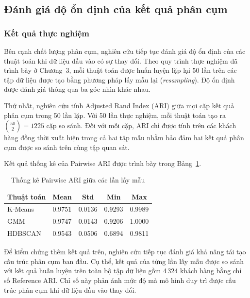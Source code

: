 \documentclass[12pt]{ai_conquer2026}
\begin{document}
\subsection{Đánh giá độ ổn định của kết quả phân cụm}

\subsubsection{Kết quả thực nghiệm}

Bên cạnh chất lượng phân cụm, nghiên cứu tiếp tục đánh giá độ ổn định của các thuật toán khi dữ liệu đầu vào có sự thay đổi. Theo quy trình thực nghiệm đã trình bày ở Chương~3, mỗi thuật toán được huấn luyện lặp lại 50 lần trên các tập dữ liệu được tạo bằng phương pháp lấy mẫu lại (\textit{resampling}). Độ ổn định được đánh giá thông qua ba góc nhìn khác nhau.

Thứ nhất, nghiên cứu tính Adjusted Rand Index (ARI) giữa mọi cặp kết quả phân cụm trong 50 lần lặp. Với 50 lần thực nghiệm, mỗi thuật toán tạo ra $\binom{50}{2}=1225$ cặp so sánh. Đối với mỗi cặp, ARI chỉ được tính trên các khách hàng đồng thời xuất hiện trong cả hai tập mẫu nhằm bảo đảm hai kết quả phân cụm được so sánh trên cùng tập quan sát.

Kết quả thống kê của Pairwise ARI được trình bày trong Bảng~\ref{tab:pairwise_ari}.

\begin{table}[H]
\centering
\caption{Thống kê Pairwise ARI giữa các lần lấy mẫu}
\label{tab:pairwise_ari}
\renewcommand{\arraystretch}{1.2}
\begin{tabular}{lcccc}
\toprule
\textbf{Thuật toán} &
\textbf{Mean} &
\textbf{Std} &
\textbf{Min} &
\textbf{Max} \\
\midrule
K-Means & 0.9751 & 0.0136 & 0.9293 & 0.9989\\
GMM & 0.9747 & 0.0143 & 0.9206 & 1.0000\\
HDBSCAN & 0.9543 & 0.0506 & 0.6894 & 0.9811\\
\bottomrule
\end{tabular}
\end{table}

Để kiểm chứng thêm kết quả trên, nghiên cứu tiếp tục đánh giá khả năng tái tạo cấu trúc phân cụm ban đầu. Cụ thể, kết quả của từng lần lấy mẫu được so sánh với kết quả huấn luyện trên toàn bộ tập dữ liệu gồm 4\,324 khách hàng bằng chỉ số Reference ARI. Chỉ số này phản ánh mức độ mà mô hình duy trì được cấu trúc phân cụm khi dữ liệu đầu vào thay đổi.
\end{document}
